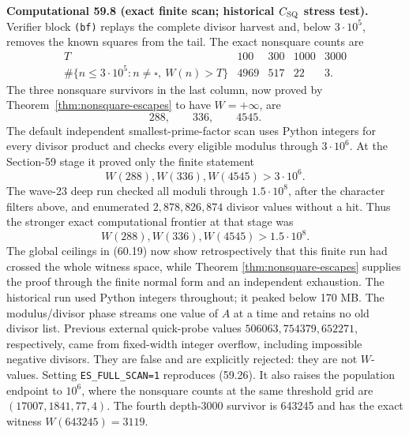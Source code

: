 \documentclass[10pt,reqno]{amsart}
\theoremstyle{definition}
\newcommand{\1}{\mathbf 1}
\begin{document}
\medskip\noindent\textbf{Computational 59.8 (exact finite scan; historical
$C_{\rm SQ}$ stress test).}
Verifier block \texttt{(bf)} replays the complete divisor harvest and, below
$3\cdot10^5$, removes the known squares from the tail.  The exact nonsquare
counts are
\begin{equation}\tag{59.23}
\begin{array}{c|rrrr}
T&100&300&1000&3000\\ \hline
\#\{n\leq3\cdot10^5:n\ne\square,\ W(n)>T\}
 &4969&517&22&3.
\end{array}
\end{equation}
The three nonsquare survivors in the last column, now proved by
Theorem~\ref{thm:nonsquare-escapes} to have $W=+\infty$, are
\begin{equation}\tag{59.24}
                         288,\qquad336,\qquad4545.
\end{equation}
The default independent smallest-prime-factor scan uses Python integers for
every divisor product and checks every eligible modulus through
$3\cdot10^6$.  At the Section-59 stage it proved only the finite statement
\begin{equation}\tag{59.25}
             W(288),W(336),W(4545)>3\cdot10^6.
\end{equation}
The wave-23 deep run checked all moduli through $1.5\cdot10^8$, after the
character filters above, and enumerated $2{,}878{,}826{,}874$ divisor values
without a hit.  Thus the stronger exact computational frontier at that stage was
\begin{equation}\tag{59.26}
             W(288),W(336),W(4545)>1.5\cdot10^8.
\end{equation}
The global ceilings in (60.19) now show retrospectively that this finite run
had crossed the whole witness space, while Theorem
\ref{thm:nonsquare-escapes} supplies the proof through the finite normal
form and an independent exhaustion.  The historical run used Python
integers throughout; it peaked below 170 MB.  The
modulus/divisor phase streams one value of $A$ at a time and retains no old
divisor list.  Previous external quick-probe values
$506063,754379,652271$, respectively, came from fixed-width integer overflow,
including impossible negative divisors.  They are false and are explicitly
rejected: they are not $W$-values.  Setting \texttt{ES\_FULL\_SCAN=1}
reproduces (59.26).  It also raises the population endpoint to $10^6$, where
the nonsquare counts at the same threshold grid are
$(17007,1841,77,4)$.  The fourth depth-3000 survivor is 643245 and has the
exact witness $W(643245)=3119$.
\end{document}
